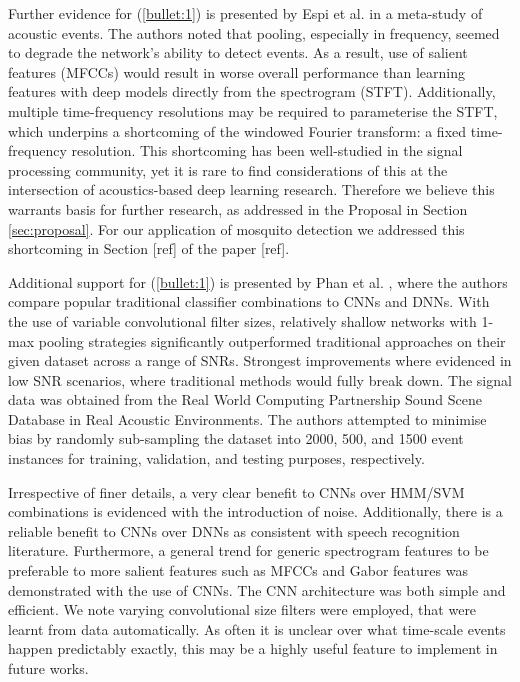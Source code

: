 \documentclass[12pt]{llncs}
\begin{document}
Further evidence for (\ref{bullet:1}) is presented by Espi et al. \cite{espi2015exploiting} in a meta-study of acoustic events. The authors noted that pooling, especially in frequency, seemed to degrade the network's ability to detect events. As a result, use of salient features (MFCCs) would result in worse overall performance than learning features with deep models directly from the spectrogram (STFT). Additionally, multiple time-frequency resolutions may be required to parameterise the STFT, which underpins a shortcoming of the windowed Fourier transform: a fixed time-frequency resolution. This shortcoming has been well-studied in the signal processing community, yet it is rare to find considerations of this at the intersection of acoustics-based deep learning research. Therefore we believe this warrants basis for further research, as addressed in the Proposal in Section \ref{sec:proposal}. For our application of mosquito detection we addressed this shortcoming in Section [ref] of the paper [ref].


Additional support for (\ref{bullet:1}) is presented by Phan et al. \cite{phan2016robust}, where the authors compare popular traditional classifier combinations to CNNs and DNNs. 
With the use of variable convolutional filter sizes, relatively shallow networks with  1-max pooling strategies significantly outperformed traditional approaches on their given dataset across a range of SNRs. Strongest improvements where evidenced in low SNR scenarios, where traditional methods would fully break down. The signal data was obtained from the Real World Computing Partnership Sound Scene Database in Real Acoustic Environments. The authors attempted to minimise bias by randomly sub-sampling the dataset into  2000, 500, and 1500 event instances for training, validation, and testing purposes, respectively. 

Irrespective of finer details, a very clear benefit to CNNs over HMM/SVM combinations is evidenced with the introduction of noise. Additionally, there is a reliable benefit to CNNs over DNNs as consistent with speech recognition literature. Furthermore, a general trend for generic spectrogram features to be preferable to more salient features such as MFCCs and Gabor features was demonstrated with the use of CNNs. The CNN architecture was both simple and efficient. We note varying convolutional size filters were employed, that were learnt from data automatically. As often it is unclear over what time-scale events happen predictably exactly, this may be a highly useful feature to implement in future works.
\end{document}
